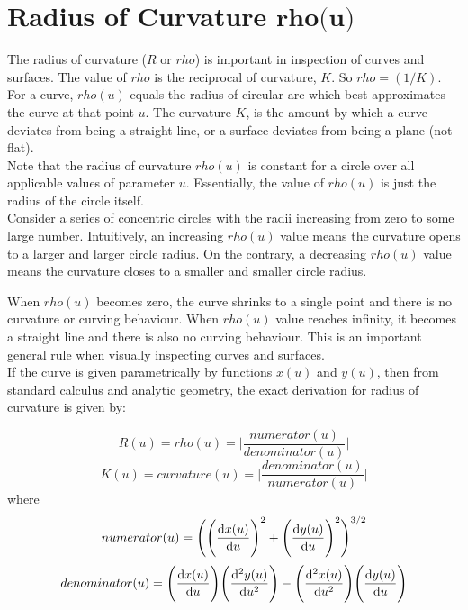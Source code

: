 \section{Radius of Curvature $\textbf{rho(u)}$}

The radius of curvature ($R$ or $rho$) is important in inspection of curves and surfaces. The value of $rho$ is the reciprocal of curvature, $K$. So $rho = (1/K)$. For a curve, $rho(u)$ equals the radius of circular arc which best approximates the curve at that point $u$. The curvature $K$, is the amount by which a curve deviates from being a straight line, or a surface deviates from being a plane (not flat).\\

Note that the radius of curvature $rho(u)$ is constant for a circle over all applicable values of parameter $u$. Essentially, the value of $rho(u)$ is just the radius of the circle itself. \\ 

Consider a series of concentric circles with the radii increasing from zero to some large number. Intuitively, an increasing $rho(u)$ value means the curvature opens to a larger and larger circle radius. On the contrary, a decreasing $rho(u)$ value means the curvature closes to a smaller and smaller circle radius. 




When $rho(u)$ becomes zero, the curve shrinks to a single point and there is no curvature or curving behaviour. When $rho(u)$ value reaches infinity, it becomes a straight line and there is also no curving behaviour. This is an important general rule when visually inspecting curves and surfaces.\\

If the curve is given parametrically by functions $x(u)$ and $y(u)$, then from standard calculus and analytic geometry, the exact derivation for radius of curvature is given by:

\[ R(u) = rho(u) = \Bigg | \frac{numerator(u)}{denominator(u)} \Bigg |  \]
\[ K(u) = curvature(u) =  \Bigg | \frac{denominator(u)}{numerator(u)} \Bigg |  \]
where 
\[ numerator(u) = \Bigg ( \Bigg ({\odv{x(u)}{u}} \Bigg )^{2} + \Bigg ({\odv{y(u)}{u}}\Bigg )^{2} \Bigg ) ^{3/2}  \]
\[ denominator(u) = \Bigg(\odv{x(u)}{u}\Bigg)\Bigg(\frac{\mathrm{d^2}y(u)}{\mathrm{d}u^2}\Bigg) - \Bigg(\frac{\mathrm{d^2}x(u)}{\mathrm{d}u^2}\Bigg)\Bigg(\odv{y(u)}{u}\Bigg)  \]




